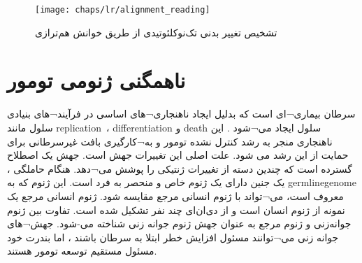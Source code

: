 \begin{figure}[!ht]
	\centerline{\texttt{[image: chaps/lr/alignment\_reading]}}
	\caption{تشخیص تغییر بدنی تک‌نوکلئوتیدی از طریق خوانش هم‌ترازی}
	\label{fig:ch_lr:alignment_reading}
\end{figure}



\section{ناهمگنی ژنومی تومور}


سرطان بیماری¬ای است که بدلیل ایجاد ناهنجاری¬های اساسی در فرآیند¬های بنیادی سلول مانند \gls{replication}\ ، \gls{differentiation}  و \gls{death} سلول  ایجاد می¬شود \cite{hanahan2011hallmarks}. این ناهنجاری منجر به رشد کنترل نشده تومور و به¬کارگیری بافت غیرسرطانی برای حمایت از این رشد می شود. علت اصلی این تغییرات جهش است. جهش یک اصطلاح گسترده است که چندین دسته از تغییرات ژنتیکی را پوشش می¬دهد. هنگام حاملگی ، یک جنین دارای یک ژنوم خاص و منحصر به فرد است. این ژنوم که به \gls{germlinegenome} معروف است، می¬تواند با ژنوم انسانی مرجع مقایسه شود. ژنوم انسانی مرجع یک نمونه از ژنوم انسان است و از دی‌ان‌ای چند نفر تشکیل شده است. تفاوت بین ژنوم جوانه‌زنی و ژنوم مرجع به عنوان جهش ژنوم جوانه زنی شناخته می-شود. جهش¬های جوانه زنی می¬توانند مسئول افزایش خطر ابتلا به سرطان باشند \cite{stewart2017world} ، اما بندرت خود مسئول مستقیم توسعه تومور هستند. 




